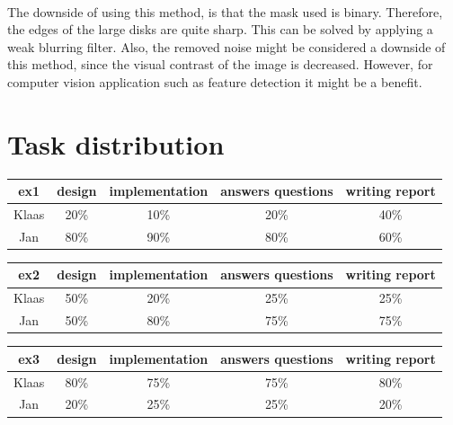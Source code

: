 \documentclass[a4paper]{article}
\begin{document}
\newpage

~\\
\noindent The downside of using this method, is that the mask used is binary. Therefore, the edges of
the large disks are quite sharp. This can be solved by applying a weak blurring filter.
Also, the removed noise might be considered a downside of this method, since the visual contrast
of the image is decreased. However, for computer vision application such as feature detection
it might be a benefit.

\newpage
\section*{Task distribution}

\begin{table}[H]
\centering
\begin{tabular}{ccccc}
ex1 & design & implementation & answers questions & writing report \\
\hline
Klaas & 20\% & 10\% & 20\% & 40\% \\
\hline
Jan & 80\% & 90\% & 80\% & 60\% \\
\end{tabular}
\end{table}

\begin{table}[H]
\centering
\begin{tabular}{ccccc}
ex2 & design & implementation & answers questions & writing report \\
\hline
Klaas & 50\% & 20\% & 25\% & 25\% \\
\hline
Jan & 50\% & 80\% & 75\% & 75\% \\
\end{tabular}
\end{table}

\begin{table}[H]
\centering
\begin{tabular}{ccccc}
ex3 & design & implementation & answers questions & writing report \\
\hline
Klaas & 80\% & 75\% & 75\% & 80\% \\
\hline
Jan & 20\% & 25\% & 25\% & 20\% \\
\end{tabular}
\end{table} 
\end{document}
